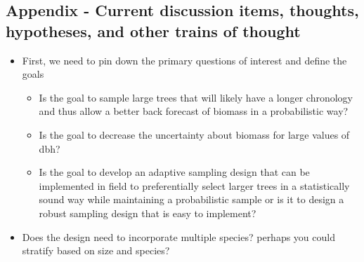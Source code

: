 \documentclass{beamer}
\begin{document}
%
\begin{frame}
  \section{Appendix - Current discussion items, thoughts, hypotheses, and other trains of thought}
  \begin{itemize}
    \item First, we need to pin down the primary questions of interest and define the goals
    \begin{itemize}
      \item Is the goal to sample large trees that will likely have a longer chronology and thus allow a better back forecast of biomass in a probabilistic way?
      \item Is the goal to decrease the uncertainty about biomass for large values of dbh?
      \item Is the goal to develop an adaptive sampling design that can be implemented in field to preferentially select larger trees in a statistically sound way while maintaining a probabilistic sample or is it to design a robust sampling design that is easy to implement?
    \end{itemize}
    \item Does the design need to incorporate multiple species? perhaps you could stratify based on size and species?
  \end{itemize}
\end{frame}
%
\end{document}
